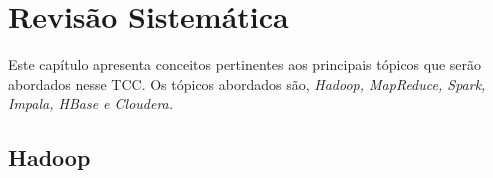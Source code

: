 \chapter[Revisão Sistemática]{Revisão Sistemática}

Este capítulo apresenta conceitos pertinentes aos principais tópicos que serão abordados
nesse TCC. Os tópicos abordados são, \textit{Hadoop, MapReduce, Spark, Impala, HBase e
Cloudera.}

\section{Hadoop}

